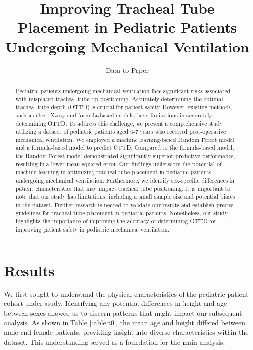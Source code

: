 \documentclass[11pt]{article}
\title{Improving Tracheal Tube Placement in Pediatric Patients Undergoing Mechanical Ventilation}
\author{Data to Paper}
\begin{document}
\maketitle
\begin{abstract}
Pediatric patients undergoing mechanical ventilation face significant risks associated with misplaced tracheal tube tip positioning. Accurately determining the optimal tracheal tube depth (OTTD) is crucial for patient safety. However, existing methods, such as chest X-ray and formula-based models, have limitations in accurately determining OTTD. To address this challenge, we present a comprehensive study utilizing a dataset of pediatric patients aged 0-7 years who received post-operative mechanical ventilation. We employed a machine learning-based Random Forest model and a formula-based model to predict OTTD. Compared to the formula-based model, the Random Forest model demonstrated significantly superior predictive performance, resulting in a lower mean squared error. Our findings underscore the potential of machine learning in optimizing tracheal tube placement in pediatric patients undergoing mechanical ventilation. Furthermore, we identify sex-specific differences in patient characteristics that may impact tracheal tube positioning. It is important to note that our study has limitations, including a small sample size and potential biases in the dataset. Further research is needed to validate our results and establish precise guidelines for tracheal tube placement in pediatric patients. Nonetheless, our study highlights the importance of improving the accuracy of determining OTTD for improving patient safety in pediatric mechanical ventilation.
\end{abstract}
\section*{Results}
We first sought to understand the physical characteristics of the pediatric patient cohort under study. Identifying any potential differences in height and age between sexes allowed us to discern patterns that might impact our subsequent analysis. As shown in Table \ref{table:t0}, the mean age and height differed between male and female patients, providing insight into diverse characteristics within the dataset. This understanding served as a foundation for the main analysis.
\end{document}
